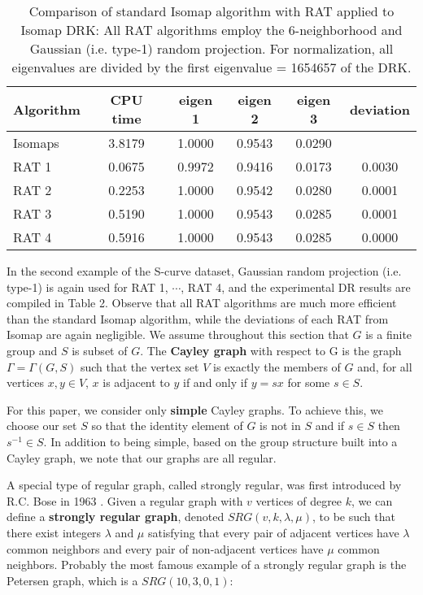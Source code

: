 \begin{table}[htb]
\begin{center}
\begin{tabular}
[c]{|l|c|c|c|c|c|}\hline
Algorithm & CPU time & eigen 1 & eigen 2 & eigen 3 &  deviation  \\
\hline
Isomaps &  3.8179  & 1.0000  & 0.9543  & 0.0290  &     \\
\hline
RAT         1 &  0.0675  & 0.9972  & 0.9416  & 0.0173  & 0.0030    \\
\hline
RAT         2 &  0.2253  & 1.0000  & 0.9542  & 0.0280  & 0.0001    \\
\hline
RAT         3 &  0.5190  & 1.0000  & 0.9543  & 0.0285  & 0.0001    \\
\hline
RAT         4 &  0.5916  & 1.0000  & 0.9543  & 0.0285  & 0.0000    \\
\hline
\end{tabular}
\end{center}
\caption{\small{Comparison of standard Isomap algorithm with RAT applied to Isomap DRK: All RAT algorithms employ the $6$-neighborhood and Gaussian (i.e. type-1) random projection. For normalization, all eigenvalues are divided by the first eigenvalue = 1654657 of the DRK.}}
\label{Tbl1}
\end{table}

In the second example of the S-curve dataset, Gaussian random projection (i.e. type-1) is again used for RAT 1, $\cdots$, RAT 4,  and the  experimental DR results are compiled in Table 2.  Observe that all RAT algorithms are much more efficient than the standard Isomap algorithm, while the deviations of each  RAT from Isomap are again negligible.
We assume throughout this section that $G$ is a finite group and $S$ is subset of $G$. The \textbf{Cayley graph} with respect to G is the graph $\Gamma = \Gamma (G,S)$ such that the vertex set $V$ is exactly the members of $G$ and, for all vertices $x,y\in V$,  $x$ is adjacent to $y$ if and only if $y = sx$ for some $s\in S$.

For this paper, we consider only \textbf{simple} Cayley graphs. To achieve this, we choose our set $S$ so that the identity element of $G$ is not in $S$ and if $s\in S$ then $s^{-1}\in S$. In addition to being simple, based on the group structure built into a Cayley graph, we note that our graphs are all regular.

A special type of regular graph, called strongly regular, was first introduced by  R.C. Bose in 1963 \cite{BCN}. Given a regular graph with $v$ vertices of degree $k$, we can define a \textbf{strongly regular graph}, denoted $SRG(v,k,\lambda, \mu)$, to be such that there exist integers $\lambda$ and $\mu$ satisfying that every pair of adjacent vertices have $\lambda$ common neighbors and every pair of non-adjacent vertices have $\mu$ common neighbors. Probably the most famous example of a strongly regular graph is the Petersen graph, which is a $SRG(10,3,0,1)$:

